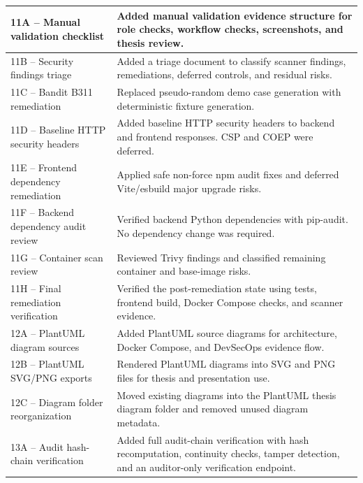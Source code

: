 \documentclass[12pt,a4paper]{report}
\begin{document}
\begin{longtable}{|p{6.2cm}|p{10cm}|}
 11A -- Manual validation checklist &
Added manual validation evidence structure for role checks, workflow checks, screenshots, and thesis review. \\
\hline

 11B -- Security findings triage &
Added a triage document to classify scanner findings, remediations, deferred controls, and residual risks. \\
\hline

 11C -- Bandit B311 remediation &
Replaced pseudo-random demo case generation with deterministic fixture generation. \\
\hline

 11D -- Baseline HTTP security headers &
Added baseline HTTP security headers to backend and frontend responses. CSP and COEP were deferred. \\
\hline

 11E -- Frontend dependency remediation &
Applied safe non-force npm audit fixes and deferred Vite/esbuild major upgrade risks. \\
\hline

 11F -- Backend dependency audit review &
Verified backend Python dependencies with pip-audit. No dependency change was required. \\
\hline

 11G -- Container scan review &
Reviewed Trivy findings and classified remaining container and base-image risks. \\
\hline

 11H -- Final remediation verification &
Verified the post-remediation state using tests, frontend build, Docker Compose checks, and scanner evidence. \\
\hline

 12A -- PlantUML diagram sources &
Added PlantUML source diagrams for architecture, Docker Compose, and DevSecOps evidence flow. \\
\hline

 12B -- PlantUML SVG/PNG exports &
Rendered PlantUML diagrams into SVG and PNG files for thesis and presentation use. \\
\hline

 12C -- Diagram folder reorganization &
Moved existing diagrams into the PlantUML thesis diagram folder and removed unused diagram metadata. \\
\hline

 13A -- Audit hash-chain verification &
Added full audit-chain verification with hash recomputation, continuity checks, tamper detection, and an auditor-only verification endpoint. \\
\hline


\end{longtable}
\end{document}
